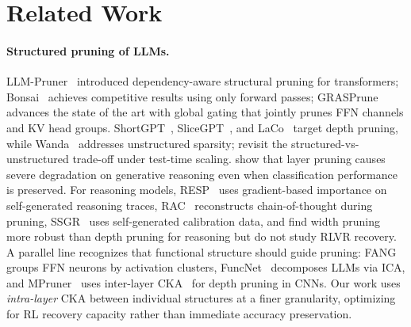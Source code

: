 \section{Related Work}
\label{sec:related}

\paragraph{Structured pruning of LLMs.}
LLM-Pruner~\citep{llmpruner2023} introduced dependency-aware structural pruning for transformers; Bonsai~\citep{bonsai2025} achieves competitive results using only forward passes; GRASPrune~\citep{graspprune2026} advances the state of the art with global gating that jointly prunes FFN channels and KV head groups.
ShortGPT~\citep{shortgpt2024}, SliceGPT~\citep{slicegpt2024}, and LaCo~\citep{yang2024laco} target depth pruning, while Wanda~\citep{wanda2024} addresses unstructured sparsity; \citet{doingmore2026} revisit the structured-vs-unstructured trade-off under test-time scaling.
\citet{shrestha2026layerpruninglimits} show that layer pruning causes severe degradation on generative reasoning even when classification performance is preserved.
For reasoning models, RESP~\citep{resp2025} uses gradient-based importance on self-generated reasoning traces, RAC~\citep{rac2025} reconstructs chain-of-thought during pruning, SSGR~\citep{ssgr2025} uses self-generated calibration data, and \citet{llms2lrms2026} find width pruning more robust than depth pruning for reasoning but do not study RLVR recovery.
A parallel line recognizes that functional structure should guide pruning: FANG~\citep{fang_2025} groups FFN neurons by activation clusters, FuncNet~\citep{funcnet_2025} decomposes LLMs via ICA, and MPruner~\citep{mpruner2024} uses inter-layer CKA~\citep{kornblith2019cka} for depth pruning in CNNs.
Our work uses \emph{intra-layer} CKA between individual structures at a finer granularity, optimizing for RL recovery capacity rather than immediate accuracy preservation.

